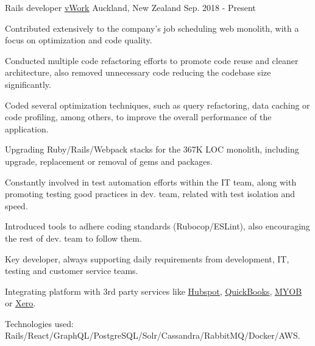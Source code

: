 
\begin{cventries}

  \cventry
    {Rails developer} %
    {\href{https://www.vworkapp.com/}{\underline{vWork}}} %
    {Auckland, New Zealand} %
    {Sep. 2018 - Present} %
    {
      \begin{cvitems} %
        \item { Contributed extensively to the company's job scheduling web
                monolith, with a focus on optimization and code quality. }
        \item { Conducted multiple code refactoring efforts to promote code
                reuse and cleaner architecture, also removed unnecessary code
                reducing the codebase size significantly. }
        \item { Coded several optimization techniques, such as query
                refactoring, data caching or code profiling, among others, to
                improve the overall performance of the application. }
        \item { Upgrading Ruby/Rails/Webpack stacks for the 367K LOC monolith,
                including upgrade, replacement or removal of gems and packages. }
        \item { Constantly involved in test automation efforts within the IT
                team, along with promoting testing good practices in dev. team,
                related with test isolation and speed. }
        \item { Introduced tools to adhere coding standards (Rubocop/ESLint),
                also encouraging the rest of dev. team to follow them. }
        \item { Key developer, always supporting daily requirements from
                development, IT, testing and customer service teams. }
        \item { Integrating platform with 3rd party services like
                \href{https://www.hubspot.com/}{\underline{Hubspot}},
                \href{https://quickbooks.intuit.com/}{\underline{QuickBooks}},
                \href{https://www.myob.com}{\underline{MYOB}} or
                \href{https://www.xero.com}{\underline{Xero}}. }
        \item { Technologies used: Rails/React/GraphQL/PostgreSQL/Solr/Cassandra/RabbitMQ/Docker/AWS. }
      \end{cvitems}
    }


\end{cventries}
